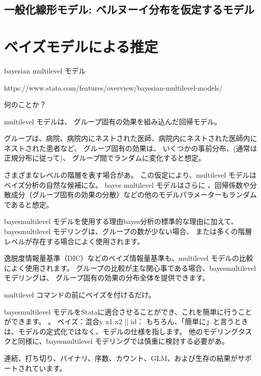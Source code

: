 \documentclass[a4j,11pt,mc]{jreport}
\begin{document}
	\section{一般化線形モデル: ベルヌーイ分布を仮定するモデル}

\chapter{ベイズモデルによる推定}\label{chapter:bayes}

	bayesian multilevel モデル

	https://www.stata.com/features/overview/bayesian-multilevel-models/

	何のことか？

	multilevel モデルは、
	グループ固有の効果を組み込んだ回帰モデル。

	グループは、病院、病院内にネストされた医師、病院内にネストされた医師内にネストされた患者など、
	グループ固有の効果は、
	いくつかの事前分布、(通常は正規分布に従って)、
	グループ間でランダムに変化すると想定。


	さまざまなレベルの階層を表す場合があ。
	この仮定により、multilevel モデルはベイズ分析の自然な候補にな。
	bayes multilevel モデルはさらに
	、回帰係数や分散成分（グループ固有の効果の分散）などの他のモデルパラメーターもランダムであると想定。


	bayesmultilevel モデルを使用する理由bayes分析の標準的な理由に加えて、
	bayesmultilevel モデリングは、グループの数が少ない場合、
	または多くの階層レベルが存在する場合によく使用されます。

	逸脱度情報量基準（DIC）などのベイズ情報量基準も、multilevel モデルの比較によく使用されます。
	グループの比較が主な関心事である場合、bayesmultilevel モデリングは、
	グループ固有の効果の分布全体を提供できます。

	multilevel コマンドの前にベイズを付けるだけ。


	bayesmultilevel モデルをStataに適合させることができ、これを簡単に行うことができます。
	。
	ベイズ：混合y x1 x2 || id：
	もちろん、「簡単に」と言うときは、モデルの定式化ではなく、モデルの仕様を指します。
	他のモデリングタスクと同様に、bayesmultilevel モデリングでは慎重に検討する必要があ。


	連続、打ち切り、バイナリ、序数、カウント、GLM、および生存の結果がサポートされています。
\end{document}
